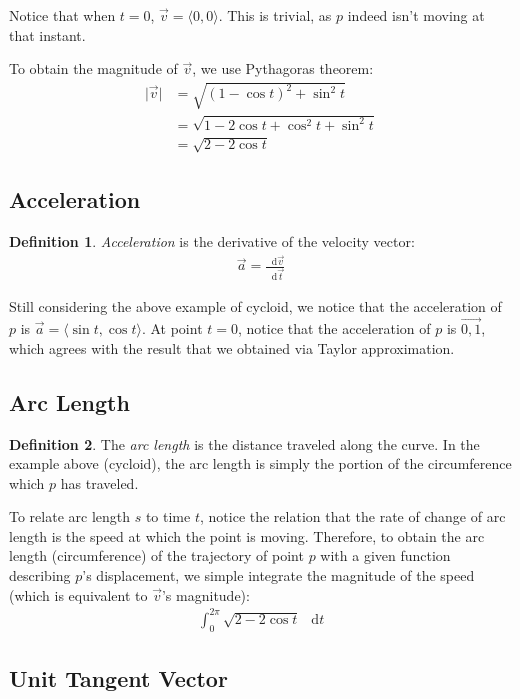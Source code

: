 \documentclass[12pt]{article}
\newcommand{\mo}[1]{\lvert #1 \rvert}
\newcommand{\iv}[1]{\langle #1 \rangle}
\newcommand*\diff{\mathop{}\!\mathrm{d}}
\theoremstyle{definition}
\newtheorem{defn}{Definition}[section]
\begin{document}
	Notice that when $t=0$, $\vec{v} = \iv{0, 0}$. This is trivial, as $p$ indeed isn't moving at that instant.
	
	To obtain the magnitude of $\vec{v}$, we use Pythagoras theorem:
	\begin{align*}
		\mo{\vec{v}} &= \sqrt{(1 - \cos t)^2 + \sin^2 t} \\
		&= \sqrt{1 - 2 \cos t + \cos^2 t + \sin^2 t} \\
		&= \sqrt{2 - 2 \cos t}
	\end{align*}
	
	\subsection{Acceleration}
	
	\begin{defn}
		\emph{Acceleration} is the derivative of the velocity vector:
		\begin{gather*}
			\vec{a} = \frac{\diff \vec{v}}{\diff \vec{t}}
		\end{gather*}
	\end{defn}
	
	Still considering the above example of cycloid, we notice that the acceleration of $p$ is $\vec{a} = \iv{\sin t, \cos t}$. At point $t = 0$, notice that the acceleration of $p$ is $\vec{0, 1}$, which agrees with the result that we obtained via Taylor approximation.
	
	\subsection{Arc Length}
	\begin{defn}
		The \emph{arc length} is the distance traveled along the curve. In the example above (cycloid), the arc length is simply the portion of the circumference which $p$ has traveled.
	\end{defn}
	
	To relate arc length $s$ to time $t$, notice the relation that the rate of change of arc length is the speed at which the point is moving. Therefore, to obtain the arc length (circumference) of the trajectory of point $p$ with a given function describing $p$'s displacement, we simple integrate the magnitude of the speed (which is equivalent to $\vec{v}$'s magnitude):
	\begin{gather*}
		\int_0^{2\pi}\sqrt{2 - 2 \cos t}\ \diff t
	\end{gather*}
	
	\subsection{Unit Tangent Vector}
	
\end{document}
